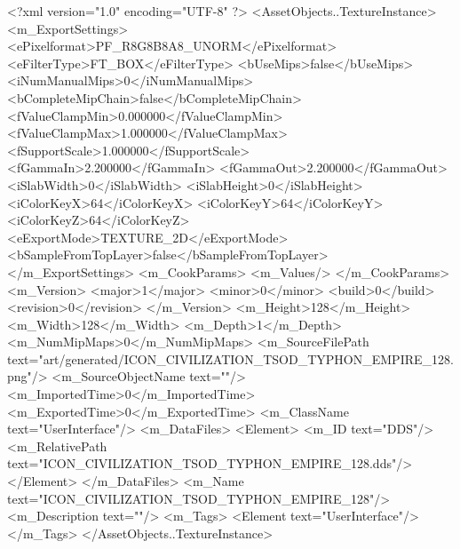 <?xml version="1.0" encoding="UTF-8" ?>
<AssetObjects..TextureInstance>
	<m_ExportSettings>
		<ePixelformat>PF_R8G8B8A8_UNORM</ePixelformat>
		<eFilterType>FT_BOX</eFilterType>
		<bUseMips>false</bUseMips>
		<iNumManualMips>0</iNumManualMips>
		<bCompleteMipChain>false</bCompleteMipChain>
		<fValueClampMin>0.000000</fValueClampMin>
		<fValueClampMax>1.000000</fValueClampMax>
		<fSupportScale>1.000000</fSupportScale>
		<fGammaIn>2.200000</fGammaIn>
		<fGammaOut>2.200000</fGammaOut>
		<iSlabWidth>0</iSlabWidth>
		<iSlabHeight>0</iSlabHeight>
		<iColorKeyX>64</iColorKeyX>
		<iColorKeyY>64</iColorKeyY>
		<iColorKeyZ>64</iColorKeyZ>
		<eExportMode>TEXTURE_2D</eExportMode>
		<bSampleFromTopLayer>false</bSampleFromTopLayer>
	</m_ExportSettings>
	<m_CookParams>
		<m_Values/>
	</m_CookParams>
	<m_Version>
		<major>1</major>
		<minor>0</minor>
		<build>0</build>
		<revision>0</revision>
	</m_Version>
	<m_Height>128</m_Height>
	<m_Width>128</m_Width>
	<m_Depth>1</m_Depth>
	<m_NumMipMaps>0</m_NumMipMaps>
	<m_SourceFilePath text="art/generated/ICON_CIVILIZATION_TSOD_TYPHON_EMPIRE_128.png"/>
	<m_SourceObjectName text=""/>
	<m_ImportedTime>0</m_ImportedTime>
	<m_ExportedTime>0</m_ExportedTime>
	<m_ClassName text="UserInterface"/>
	<m_DataFiles>
		<Element>
			<m_ID text="DDS"/>
			<m_RelativePath text="ICON_CIVILIZATION_TSOD_TYPHON_EMPIRE_128.dds"/>
		</Element>
	</m_DataFiles>
	<m_Name text="ICON_CIVILIZATION_TSOD_TYPHON_EMPIRE_128"/>
	<m_Description text=""/>
	<m_Tags>
		<Element text="UserInterface"/>
	</m_Tags>
</AssetObjects..TextureInstance>
